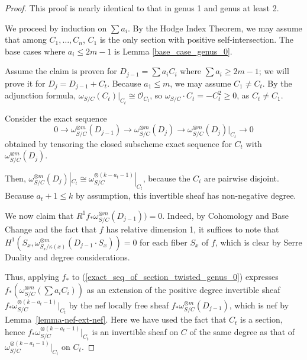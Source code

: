 \begin{proof}
This proof is nearly identical to that in genus 1 and genus at least 2.

We proceed by induction on $\sum a_i$.
By the Hodge Index Theorem, we may assume that among $C_1,\ldots,C_n$, $C_1$ is the only section with positive self-intersection.
The base cases where $a_i\le 2m-1$ is Lemma \ref{base_case_genus_0}.

Assume the claim is proven for $D_{j-1}=\sum a_iC_i$ where $\sum a_i\ge 2m-1$; we will prove it for $D_{j}=D_{j-1}+C_t$.
Because $a_{1}\le m$, we may assume $C_1\neq C_t$.
By the adjunction formula, $\omega_{S/C}(C_t)|_{C_t}\cong\mathcal{O}_{C_t}$, so $\omega_{S/C}\cdot C_t=-C_t^2\ge0$, as $C_t\neq C_1$.

Consider the exact sequence
\begin{equation*}\label{exact_seq_of_section_twisted_genus_0}
0\to\omega_{S/C}^{\otimes m}(D_{j-1})\to\omega_{S/C}^{\otimes m}(D_j)\to \omega_{S/C}^{\otimes m}(D_j)|_{C_t}\to0
\end{equation*}
obtained by tensoring the closed subscheme exact sequence for $C_t$ with $\omega_{S/C}^{\otimes m}(D_j)$.

Then, $\omega_{S/C}^{\otimes m}(D_j)|_{C_t}\cong \omega_{S/C}^{\otimes (k-a_{t}-1)}|_{C_t}$, because the $C_i$ are pairwise disjoint.
Because $a_{t}+1\le k$ by assumption, this invertible sheaf has non-negative degree.

We now claim that $R^{1}f_{*}\omega_{S/C}^{\otimes m}(D_{j-1}))=0$.
Indeed, by Cohomology and Base Change and the fact that $f$ has relative dimension 1, it suffices to note that $H^{1}(S_x,\omega_{S_x/\kappa(x)}^{\otimes m}(D_{j-1}\cdot S_x))=0$ for each fiber $S_x$ of $f$, which is clear by Serre Duality and degree considerations.

Thus, applying $f_{*}$ to (\ref{exact_seq_of_section_twisted_genus_0})
expresses $f_{*}(\omega_{S/C}^{\otimes m}(\sum a_iC_i))$ as an extension of the
positive degree invertible sheaf
$f_{*}\omega_{S/C}^{\otimes (k-a_{t}-1)}|_{C_t}$ by the nef locally free sheaf
$f_{*}\omega_{S/C}^{\otimes m}(D_{j-1})$, which is nef by Lemma~\ref{lemma-nef-ext-nef}.
Here we have used the fact that $C_t$ is a section, hence $f_{*}\omega_{S/C}^{\otimes (k-a_{t}-1)}|_{C_t}$ is an invertible sheaf on $C$ of the same degree as that of $\omega_{S/C}^{\otimes (k-a_{t}-1)}|_{C_t}$ on $C_t$.
\end{proof}

